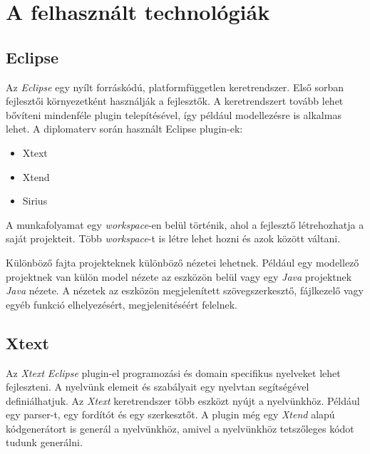 \clearpage\section{A felhasznált technológiák}
\subsection{Eclipse}

Az \textit{Eclipse} egy nyílt forráskódú, platformfüggetlen keretrendszer.
Első sorban fejlesztői környezetként használják a fejlesztők.
A keretrendszert tovább lehet bővíteni mindenféle plugin telepítésével, így például modellezésre is alkalmas lehet.
A diplomaterv során használt Eclipse plugin-ek:

\begin{itemize}
    \item Xtext
    \item Xtend
    \item Sirius
\end{itemize}

A munkafolyamat egy \textit{workspace}-en belül történik, ahol a fejlesztő létrehozhatja a saját projekteit.
Több \textit{workspace}-t is létre lehet hozni és azok között váltani.

Különböző fajta projekteknek különböző nézetei lehetnek.
Például egy modellező projektnek van külön model nézete az eszközön belül vagy egy \textit{Java} projektnek \textit{Java} nézete.
A nézetek az eszközön megjelenített szövegszerkesztő, fájlkezelő vagy egyéb funkció elhelyezésért, megjelenitéséért felelnek.

\subsection{Xtext}

Az \textit{Xtext} \textit{Eclipse} plugin-el programozási és domain specifikus nyelveket lehet fejleszteni.
A nyelvünk elemeit és szabályait egy nyelvtan segítségével definiálhatjuk.
Az \textit{Xtext} keretrendszer több eszközt nyújt a nyelvünkhöz.
Például egy parser-t, egy fordítót és egy szerkesztőt.
A plugin még egy \textit{Xtend} alapú kódgenerátort is generál a nyelvünkhöz, amivel a nyelvünkhöz tetszőleges kódot tudunk generálni.

